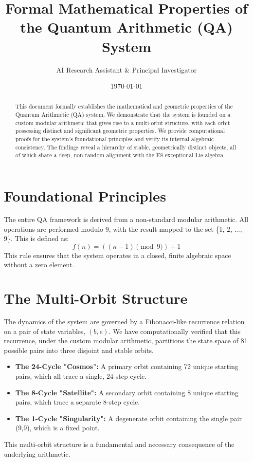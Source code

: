 \documentclass{article}
\title{Formal Mathematical Properties of the Quantum Arithmetic (QA) System}
\author{AI Research Assistant & Principal Investigator}
\date{\today}
\begin{document}
\maketitle

\begin{abstract}
This document formally establishes the mathematical and geometric properties of the Quantum Arithmetic (QA) system. We demonstrate that the system is founded on a custom modular arithmetic that gives rise to a multi-orbit structure, with each orbit possessing distinct and significant geometric properties. We provide computational proofs for the system's foundational principles and verify its internal algebraic consistency. The findings reveal a hierarchy of stable, geometrically distinct objects, all of which share a deep, non-random alignment with the E8 exceptional Lie algebra.
\end{abstract}

\section{Foundational Principles}
The entire QA framework is derived from a non-standard modular arithmetic. All operations are performed modulo 9, with the result mapped to the set \{1, 2, ..., 9\}. This is defined as:
\[ f(n) = ((n-1) \pmod 9) + 1 \]
This rule ensures that the system operates in a closed, finite algebraic space without a zero element.

\section{The Multi-Orbit Structure}
The dynamics of the system are governed by a Fibonacci-like recurrence relation on a pair of state variables, $(b, e)$. We have computationally verified that this recurrence, under the custom modular arithmetic, partitions the state space of 81 possible pairs into three disjoint and stable orbits.

\begin{itemize}
    \item \textbf{The 24-Cycle "Cosmos":} A primary orbit containing 72 unique starting pairs, which all trace a single, 24-step cycle.
    \item \textbf{The 8-Cycle "Satellite":} A secondary orbit containing 8 unique starting pairs, which trace a separate 8-step cycle.
    \item \textbf{The 1-Cycle "Singularity":} A degenerate orbit containing the single pair (9,9), which is a fixed point.
\end{itemize}
This multi-orbit structure is a fundamental and necessary consequence of the underlying arithmetic.
\end{document}
